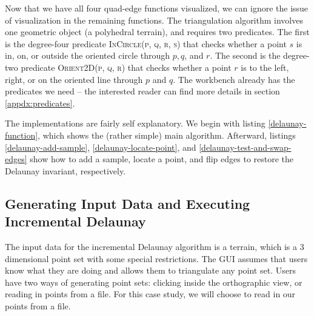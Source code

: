 Now that we have all four quad-edge functions visualized, we can ignore the
issue of visualization in the remaining functions. The triangulation algorithm
involves one geometric object (a polyhedral terrain), and requires two
predicates. The first is the degree-four predicate \textsc{InCircle(p, q, r, s)}
that checks whether a point $s$ is in, on, or outside the oriented circle
through $p, q$, and $r$. The second is the degree-two predicate
\textsc{Orient2D(p, q, r)} that checks whether a point $r$ is to the left,
right, or on the oriented line through $p$ and $q$. The workbench already has
the predicates we need -- the interested reader can find more details in
section \ref{appdx:predicates}.

The implementations are fairly self explanatory. We begin with listing
\ref{delaunay-function}, which shows the (rather simple) main algorithm.
Afterward, listings \ref{delaunay-add-sample}, \ref{delaunay-locate-point}, and
\ref{delaunay-test-and-swap-edges} show how to add a sample, locate a point, and
flip edges to restore the Delaunay invariant, respectively.
 









\FloatBarrier
\subsection{Generating Input Data and Executing Incremental Delaunay} 

The input data for the incremental Delaunay algorithm is a terrain, which is a 3
dimensional point set with some special restrictions. The GUI assumes that users
know what they are doing and allows them to triangulate any point set. Users
have two ways of generating point sets: clicking inside the orthographic
view, or reading in points from a file. For this case study, we will choose to
read in our points from a file.

